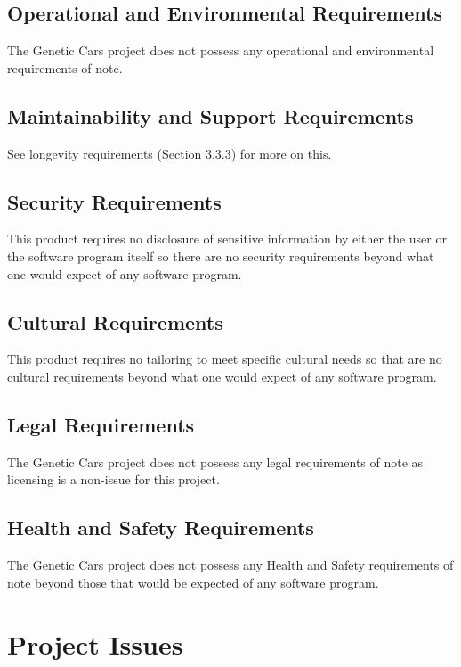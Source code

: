 \documentclass[12pt, titlepage]{article}
\begin{document}
\subsection{Operational and Environmental Requirements}

The Genetic Cars project does not possess any operational and environmental requirements of note.

\subsection{Maintainability and Support Requirements}

See longevity requirements (Section 3.3.3) for more on this.

\subsection{Security Requirements}

This product requires no disclosure of sensitive information by either the user or the software program itself so there are no security requirements beyond what one would expect of any software program.

\subsection{Cultural Requirements}

This product requires no tailoring to meet specific cultural needs so that are no cultural requirements beyond what one would expect of any software program.

\subsection{Legal Requirements}

The Genetic Cars project does not possess any legal requirements of note as licensing is a non-issue for this project.

\subsection{Health and Safety Requirements}

The Genetic Cars project does not possess any Health and Safety requirements of note beyond those that would be expected of any software program.
\section{Project Issues}
\end{document}
